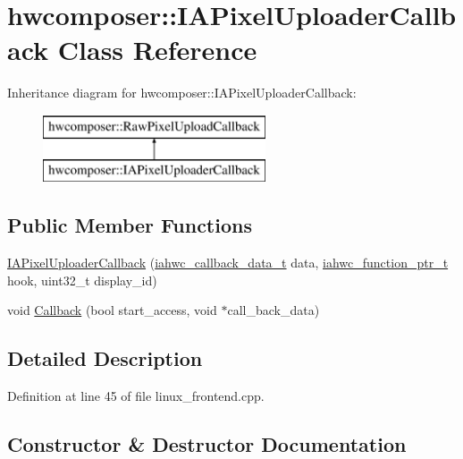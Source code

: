 \hypertarget{classhwcomposer_1_1IAPixelUploaderCallback}{}\section{hwcomposer\+:\+:I\+A\+Pixel\+Uploader\+Callback Class Reference}
\label{classhwcomposer_1_1IAPixelUploaderCallback}
Inheritance diagram for hwcomposer\+:\+:I\+A\+Pixel\+Uploader\+Callback\+:\begin{figure}[H]
\begin{center}
\leavevmode
\includegraphics[height=2.000000cm]{classhwcomposer_1_1IAPixelUploaderCallback}
\end{center}
\end{figure}
\subsection*{Public Member Functions}
\begin{DoxyCompactItemize}
\item 
\mbox{\hyperlink{classhwcomposer_1_1IAPixelUploaderCallback_afe6ad27fcab01574ec2f70197f69e54e}{I\+A\+Pixel\+Uploader\+Callback}} (\mbox{\hyperlink{iahwc_8h_a07fb4f73baa8a0cfbd40f64071e56a7c}{iahwc\+\_\+callback\+\_\+data\+\_\+t}} data, \mbox{\hyperlink{iahwc_8h_a214bf51cce821fdb7b24210088c12cad}{iahwc\+\_\+function\+\_\+ptr\+\_\+t}} hook, uint32\+\_\+t display\+\_\+id)
\item 
void \mbox{\hyperlink{classhwcomposer_1_1IAPixelUploaderCallback_aadcf6756b46e8d237ac52a87199fc4eb}{Callback}} (bool start\+\_\+access, void $\ast$call\+\_\+back\+\_\+data)
\end{DoxyCompactItemize}


\subsection{Detailed Description}


Definition at line 45 of file linux\+\_\+frontend.\+cpp.



\subsection{Constructor \& Destructor Documentation}
\mbox{\label{classhwcomposer_1_1IAPixelUploaderCallback_afe6ad27fcab01574ec2f70197f69e54e}} 
